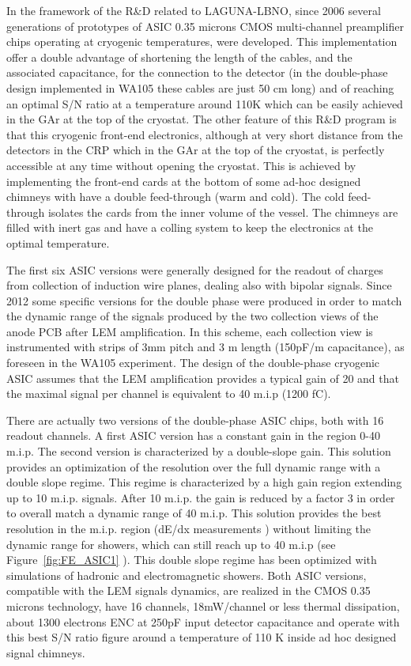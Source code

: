 In the framework of the R\&D related to LAGUNA-LBNO, since 2006 several generations of prototypes of ASIC 0.35 microns CMOS multi-channel preamplifier chips operating at cryogenic temperatures, were developed. This implementation offer a double advantage of shortening the length of the cables, and the associated capacitance, for the connection to the detector (in the double-phase design implemented in WA105 these cables are just 50 cm long) and of reaching an optimal S/N ratio at a temperature around 110K which can be easily achieved in the GAr at the top of the cryostat. The other feature of this R\&D program is that this cryogenic front-end electronics, although at very short distance from the detectors in the CRP which in the GAr at the top of the cryostat,  is perfectly accessible at any time without opening the cryostat. This is achieved by implementing the front-end cards at the bottom of some ad-hoc designed chimneys with have a double feed-through (warm and cold). The cold feed-through isolates the cards from the inner volume of the vessel. The chimneys are filled with inert gas and have a colling system to keep the electronics at the optimal temperature.

The first six ASIC versions were generally designed for the readout of charges from collection of induction wire planes, dealing also with bipolar signals. Since 2012 some specific versions for the double phase were produced in order to match the dynamic range of the signals produced by the two collection views of the anode PCB after LEM amplification. In this scheme, each collection  view is instrumented with strips of 3mm pitch and 3 m length (150pF/m capacitance), as foreseen in the WA105 experiment. The design of the double-phase cryogenic ASIC  assumes that the LEM amplification provides a typical gain of 20 and that the maximal signal per channel is equivalent to 40 m.i.p (1200 fC).

There are actually two versions of the double-phase ASIC chips, both with 16 readout channels. A first ASIC version has a constant gain in the region 0-40 m.i.p. The second version is characterized by a double-slope gain. This solution provides an optimization of the resolution over the full dynamic range with a double slope regime. This regime is characterized by a high gain region extending up to 10 m.i.p. signals. After 10 m.i.p. the gain is reduced by a factor 3 in order to overall match a dynamic range of 40 m.i.p. This solution provides the best resolution in the m.i.p. region (dE/dx measurements ) without limiting the dynamic range for showers, which can  still reach up to 40 m.i.p   (see  Figure~\ref{fig:FE_ASIC1} ). This double slope regime has been optimized with simulations of hadronic and electromagnetic showers. Both ASIC versions, compatible with the LEM signals dynamics,  are realized in the CMOS 0.35 microns technology,  have 16 channels, 18mW/channel or less thermal dissipation,  about 1300 electrons ENC at 250pF input detector capacitance and operate with this best S/N ratio figure around  a temperature of 110 K inside ad hoc designed signal chimneys.

